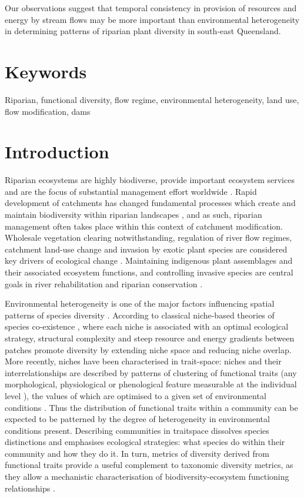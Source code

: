 \documentclass[openright,12pt,a4paper]{memoir}
\begin{document}
Our observations suggest that temporal consistency in provision of resources and energy by stream flows may be more important than environmental heterogeneity in determining patterns of riparian plant diversity in south-east Queensland. 


\section*{Keywords}
Riparian, functional diversity, flow regime, environmental heterogeneity, land use, flow modification, dams

\clearpage

\section{Introduction}
Riparian ecosystems are highly biodiverse, provide important ecosystem services and are the focus of substantial management effort worldwide \citep{Naiman1993, Palmer2009}. Rapid development of catchments has changed fundamental processes which create and maintain biodiversity within riparian landscapes \citep{Nilsson2002}, and as such, riparian management often takes place within this context of catchment modification. Wholesale vegetation clearing notwithstanding, regulation of river flow regimes, catchment land-use change and invasion by exotic plant species are considered key drivers of ecological change \citep{Nilsson2000, Stromberg2007, Cooper2013}. Maintaining indigenous plant assemblages and their associated ecosystem functions, and controlling invasive species are central goals in river rehabilitation and riparian conservation \citep{Richardson2007}.

Environmental heterogeneity is one of the major factors influencing spatial patterns of species diversity \citep{Costanza2011, Stein2014}. According to classical niche-based theories of species co-existence \citep{Chesson2000}, where each niche is associated with an optimal ecological strategy, structural complexity and steep resource and energy gradients between patches promote diversity by extending niche space and reducing niche overlap. More recently, niches have been characterised in trait-space: niches and their interrelationships are described by patterns of clustering of functional traits (any morphological, physiological or phenological feature measurable at the individual level \citep{Violle2007}), the values of which are optimised to a given set of environmental conditions \citep{Adler2013}. Thus the distribution of functional traits within a community can be expected to be patterned by the degree of heterogeneity in environmental conditions present. Describing communities in traitspace dissolves species distinctions and emphasises ecological strategies: what species do within their community and how they do it. In turn, metrics of diversity derived from functional traits provide a useful complement to taxonomic diversity metrics, as they allow a mechanistic characterisation of biodiversity-ecosystem functioning relationships \citep{Hillebrand2009}. 
\end{document}
